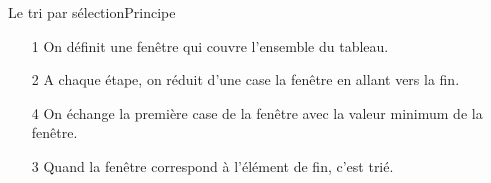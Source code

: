 \documentclass[12pt,a4paper]{beamer}
\begin{document}
\begin{frame}{Le tri par sélection}{Principe}

\begin{itemize}
\item[1]On définit une fenêtre qui couvre l'ensemble du tableau.
\item[2]A chaque étape, on réduit d'une case la fenêtre en allant vers la fin.
\item[4]On échange la première case de la fenêtre avec la valeur minimum de la fenêtre.
\item[3]Quand la fenêtre correspond à l'élément de fin, c'est trié.
\end{itemize}

\end{frame}
\end{document}
